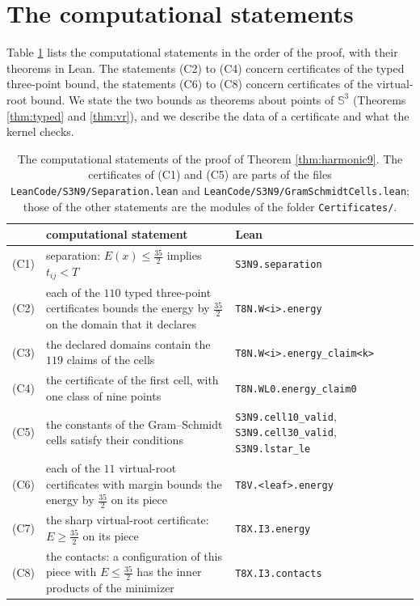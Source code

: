 \documentclass[reqno,a4paper,11pt]{amsart}
\numberwithin{equation}{section}
\newcommand{\Sph}{\mathbb{S}}
\newcommand{\lean}[1]{\texttt{#1}}
\newcommand{\file}[1]{\nolinkurl{#1}}
\begin{document}
\section{The computational statements}\label{sec:computational}

Table \ref{tab:s3n9} lists the computational statements in the order of the proof, with their theorems in Lean. The statements (C2) to (C4) concern certificates of the typed three-point bound, the statements (C6) to (C8) concern certificates of the virtual-root bound. We state the two bounds as theorems about points of $\Sph^3$ (Theorems \ref{thm:typed} and \ref{thm:vr}), and we describe the data of a certificate and what the kernel checks.

\begin{table}[ht]
\centering
\small
\begin{tabular}{@{}lp{}p{}@{}}
\toprule
 & computational statement & Lean \\
\midrule
(C1) & separation: $E(x) \leq \tfrac{35}{2}$ implies $t_{ij} < T$ & \lean{S3N9.separation} \\
(C2) & each of the $110$ typed three-point certificates bounds the energy by $\tfrac{35}{2}$ on the domain that it declares & \lean{T8N.W<i>.energy} \\
(C3) & the declared domains contain the $119$ claims of the cells & \lean{T8N.W<i>.energy\_claim<k>} \\
(C4) & the certificate of the first cell, with one class of nine points & \lean{T8N.WL0.energy\_claim0} \\
(C5) & the constants of the Gram--Schmidt cells satisfy their conditions & \lean{S3N9.cell10\_valid}, \newline \lean{S3N9.cell30\_valid}, \lean{S3N9.lstar\_le} \\
(C6) & each of the $11$ virtual-root certificates with margin bounds the energy by $\tfrac{35}{2}$ on its piece & \lean{T8V.<leaf>.energy} \\
(C7) & the sharp virtual-root certificate: $E \geq \tfrac{35}{2}$ on its piece & \lean{T8X.I3.energy} \\
(C8) & the contacts: a configuration of this piece with $E \leq \tfrac{35}{2}$ has the inner products of the minimizer & \lean{T8X.I3.contacts} \\
\bottomrule
\end{tabular}
\medskip
\caption{The computational statements of the proof of Theorem \ref{thm:harmonic9}. The certificates of (C1) and (C5) are parts of the files \file{LeanCode/S3N9/Separation.lean} and \file{LeanCode/S3N9/GramSchmidtCells.lean}; those of the other statements are the modules of the folder \file{Certificates/}.}\label{tab:s3n9}
\end{table}
\end{document}
